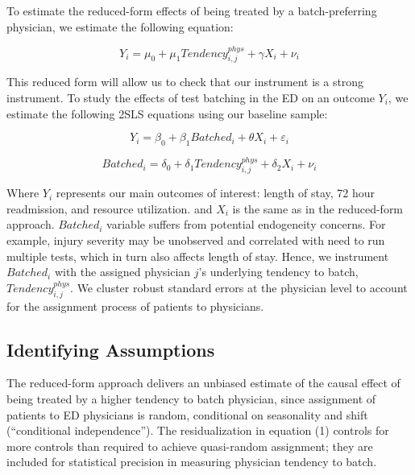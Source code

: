 \documentclass[,,nonblindrev]{informs}
\begin{document}
To estimate the reduced-form effects of being treated by a
batch-preferring physician, we estimate the following equation:

\begin{equation}
Y_i = \mu_0 + \mu_1 Tendency_{i,j}^{phys} + \gamma X_i + \nu_i
\end{equation}

This reduced form will allow us to check that our instrument is a strong
instrument. To study the effects of test batching in the ED on an
outcome \(Y_i\), we estimate the following 2SLS equations using our
baseline sample:

\begin{equation}
Y_i = \beta_0 + \beta_1 Batched_i + \theta X_i + \varepsilon_i
\end{equation}

\begin{equation}
Batched_i = \delta_0 + \delta_1 Tendency_{i,j}^{phys} + \delta_2 X_i + \nu_i
\end{equation}

Where \(Y_i\) represents our main outcomes of interest: length of stay,
72 hour readmission, and resource utilization. and \(X_i\) is the same
as in the reduced-form approach. \(Batched_i\) variable suffers from
potential endogeneity concerns. For example, injury severity may be
unobserved and correlated with need to run multiple tests, which in turn
also affects length of stay. Hence, we instrument \(Batched_i\) with the
assigned physician \(j\)'s underlying tendency to batch,
\(Tendency_{i,j}^{phys}\). We cluster robust standard errors at the
physician level to account for the assignment process of patients to
physicians.

\hypertarget{identifying-assumptions}{%
\subsection{Identifying Assumptions}\label{identifying-assumptions}}

The reduced-form approach delivers an unbiased estimate of the causal
effect of being treated by a higher tendency to batch physician, since
assignment of patients to ED physicians is random, conditional on
seasonality and shift (``conditional independence''). The
residualization in equation (1) controls for more controls than required
to achieve quasi-random assignment; they are included for statistical
precision in measuring physician tendency to batch.
\end{document}
